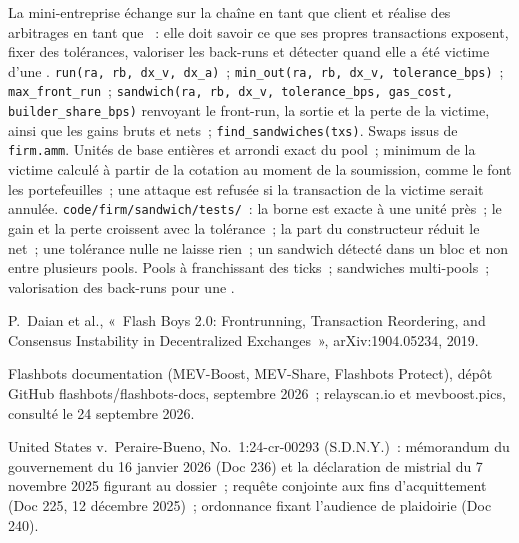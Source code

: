 \begin{build}
 La mini-entreprise échange sur la chaîne en tant que client et réalise des arbitrages en tant que ~: elle doit savoir ce que ses propres transactions exposent,
fixer des tolérances, valoriser les back-runs et détecter quand elle a été victime d'une .
 \texttt{run(ra, rb, dx\_v, dx\_a)}~; \texttt{min\_out(ra, rb, dx\_v, tolerance\_bps)}~; \texttt{max\_front\_run}~; \texttt{sandwich(ra,
rb, dx\_v, tolerance\_bps, gas\_cost, builder\_share\_bps)} renvoyant le front-run, la sortie et la perte de la victime, ainsi que les gains bruts et nets~;
\texttt{find\_sandwiches(txs)}. Swaps issus de \texttt{firm.amm}.
 Unités de base entières et arrondi exact du pool~; minimum de la victime calculé à partir de la cotation au moment de la soumission, comme le font les portefeuilles~; une attaque
est refusée si la transaction de la victime serait annulée.
 \texttt{code/firm/sandwich/tests/}~: la borne est exacte à une unité près~; le gain et la perte croissent avec la tolérance~; la part du constructeur réduit
le net~; une tolérance nulle ne laisse rien~; un sandwich détecté dans un bloc et non entre plusieurs pools.
 Pools à  franchissant des ticks~; sandwiches multi-pools~; valorisation des back-runs pour une .
\end{build}

\begin{omsources}
\item P.~Daian et al., «~Flash Boys 2.0: Frontrunning, Transaction Reordering, and Consensus Instability in Decentralized Exchanges~»,
arXiv:1904.05234, 2019.
\item Flashbots documentation (MEV-Boost, MEV-Share, Flashbots Protect), dépôt GitHub flashbots/flashbots-docs, septembre 2026~; relayscan.io
et mevboost.pics, consulté le 24 septembre 2026.
\item United States v.\ Peraire-Bueno, No.\ 1:24-cr-00293 (S.D.N.Y.)~: mémorandum du gouvernement du 16 janvier 2026 (Doc 236) et la déclaration
de mistrial du 7 novembre 2025 figurant au dossier~; requête conjointe aux fins d'acquittement (Doc 225, 12 décembre 2025)~; ordonnance fixant l'audience de plaidoirie (Doc 240).
\end{omsources}

